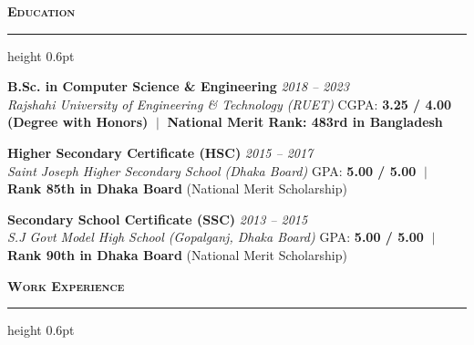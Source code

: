 \documentclass[9.5pt,a4paper]{article}
\newcommand{\resumesection}[1]{%
    \vspace{4.0pt}%
    {\color{burgundy}\scshape\bfseries\fontsize{10.0pt}{11.2pt}\selectfont #1}%
    \vspace{1.0pt}%
    \hrule height 0.6pt\relax%
    \vspace{2.5pt}%
}
\begin{document}
\vspace{1.0pt}

\resumesection{Education}

\noindent\textbf{B.Sc. in Computer Science \& Engineering} \hfill {\small\textit{2018 -- 2023}}\\
\textit{Rajshahi University of Engineering \& Technology (RUET)} \hfill {\small CGPA: \textbf{3.25 / 4.00 (Degree with Honors)} $\;\vert\;$ \textbf{National Merit Rank: 483rd in Bangladesh}}

\vspace{1.5pt}
\noindent\textbf{Higher Secondary Certificate (HSC)} \hfill {\small\textit{2015 -- 2017}}\\
\textit{Saint Joseph Higher Secondary School (Dhaka Board)} \hfill {\small GPA: \textbf{5.00 / 5.00} $\;\vert\;$ \textbf{Rank 85th in Dhaka Board} (National Merit Scholarship)}

\vspace{1.5pt}
\noindent\textbf{Secondary School Certificate (SSC)} \hfill {\small\textit{2013 -- 2015}}\\
\textit{S.J Govt Model High School (Gopalganj, Dhaka Board)} \hfill {\small GPA: \textbf{5.00 / 5.00} $\;\vert\;$ \textbf{Rank 90th in Dhaka Board} (National Merit Scholarship)}

\resumesection{Work Experience}
\end{document}
